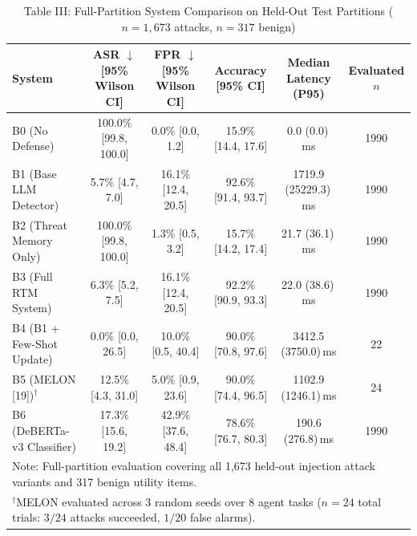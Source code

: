 \begin{table}[t]
\centering
\caption{Table III: Full-Partition System Comparison on Held-Out Test Partitions ($n=1,673$ attacks, $n=317$ benign)}
\label{tab:main_comparison}
\begin{tabular}{l c c c c c}
\hline
\textbf{System} & \textbf{ASR} $\downarrow$ [95\% Wilson CI] & \textbf{FPR} $\downarrow$ [95\% Wilson CI] & \textbf{Accuracy} [95\% CI] & \textbf{Median Latency (P95)} & \textbf{Evaluated $n$} \\
\hline
B0 (No Defense) & 100.0\% [99.8, 100.0] & 0.0\% [0.0, 1.2] & 15.9\% [14.4, 17.6] & 0.0 (0.0)\,ms & 1990 \\
B1 (Base LLM Detector) & 5.7\% [4.7, 7.0] & 16.1\% [12.4, 20.5] & 92.6\% [91.4, 93.7] & 1719.9 (25229.3)\,ms & 1990 \\
B2 (Threat Memory Only) & 100.0\% [99.8, 100.0] & 1.3\% [0.5, 3.2] & 15.7\% [14.2, 17.4] & 21.7 (36.1)\,ms & 1990 \\
B3 (Full RTM System) & 6.3\% [5.2, 7.5] & 16.1\% [12.4, 20.5] & 92.2\% [90.9, 93.3] & 22.0 (38.6)\,ms & 1990 \\
B4 (B1 + Few-Shot Update) & 0.0\% [0.0, 26.5] & 10.0\% [0.5, 40.4] & 90.0\% [70.8, 97.6] & 3412.5 (3750.0)\,ms & 22 \\
B5 (MELON [19])$^\dagger$ & 12.5\% [4.3, 31.0] & 5.0\% [0.9, 23.6] & 90.0\% [74.4, 96.5] & 1102.9 (1246.1)\,ms & 24 \\
B6 (DeBERTa-v3 Classifier) & 17.3\% [15.6, 19.2] & 42.9\% [37.6, 48.4] & 78.6\% [76.7, 80.3] & 190.6 (276.8)\,ms & 1990 \\
\hline
\multicolumn{6}{l}{\small Note: Full-partition evaluation covering all 1,673 held-out injection attack variants and 317 benign utility items.} \\
\multicolumn{6}{l}{\small $^\dagger$MELON evaluated across 3 random seeds over 8 agent tasks ($n=24$ total trials: $3/24$ attacks succeeded, $1/20$ false alarms).} \\
\hline
\end{tabular}
\end{table}
